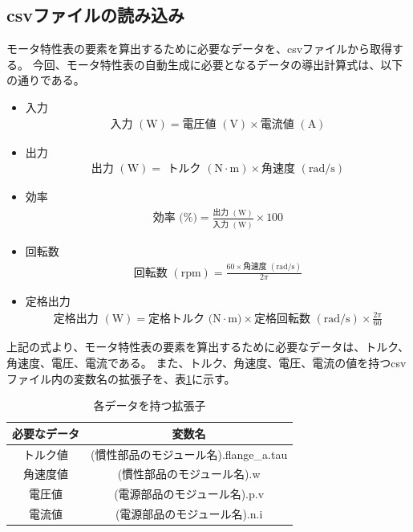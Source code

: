 \subsection{csvファイルの読み込み}\label{sub:csv_scan}
モータ特性表の要素を算出するために必要なデータを、csvファイルから取得する。
今回、モータ特性表の自動生成に必要となるデータの導出計算式は、以下の通りである。
\begin{itemize}

        \item 入力  \begin{eqnarray} \mbox{入力 $(\mathrm{W})$} = \mbox{電圧値 $(\mathrm{V})$} \times \mbox{電流値 $(\mathrm{A})$} 　\label{siki:in}
    \end{eqnarray}
    \item 出力 
    \begin{eqnarray}
    \mbox{出力 $(\mathrm{W})$} = \mbox{ トルク $(\mathrm{N \cdot m})$} \times \mbox{角速度 $(\mathrm{rad/s})$} \label{siki:out}
     \end{eqnarray}
     \item 効率
    \begin{eqnarray}
        \mbox{効率 (\%)} = \frac{\mbox{出力 $(\mathrm{W})$}}{\mbox{入力 $(\mathrm{W})$}}  \times 100 \label{siki:effi}
       \end{eqnarray}
        \item 回転数  \begin{eqnarray} \mbox{回転数 $(\mathrm{rpm})$} = \frac{60 \times \mbox{角速度 $(\mathrm{rad/s})$}}{2\pi}   \label{siki:speed}
    \end{eqnarray}
        \item 定格出力  \begin{eqnarray} \mbox{定格出力 $(\mathrm{W})$} = \mbox{定格トルク $(\mathrm{N \cdot m)}$} \times \mbox{定格回転数  $(\mathrm{rad/s})$} \times \frac{2\pi}{60}　
            \label{siki:teikaku}
     \end{eqnarray}
     
\end{itemize}

上記の式より、モータ特性表の要素を算出するために必要なデータは、トルク、角速度、電圧、電流である。
また、トルク、角速度、電圧、電流の値を持つcsvファイル内の変数名の拡張子を、表\ref{tab:hensuu}に示す。　
\begin{table}[t]
	\centering
	\caption{各データを持つ拡張子}
	\begin{tabular}{|c|c|} \hline
	  必要なデータ & 変数名 \\ \hline \hline
	  トルク値 & (慣性部品のモジュール名).flange\_a.tau \\ \hline
	  角速度値 &  (慣性部品のモジュール名).w \\ \hline
	  電圧値 &  (電源部品のモジュール名).p.v \\ \hline
	  電流値 &  (電源部品のモジュール名).n.i \\ \hline
	\end{tabular}
	\label{tab:hensuu}
  \end{table}


